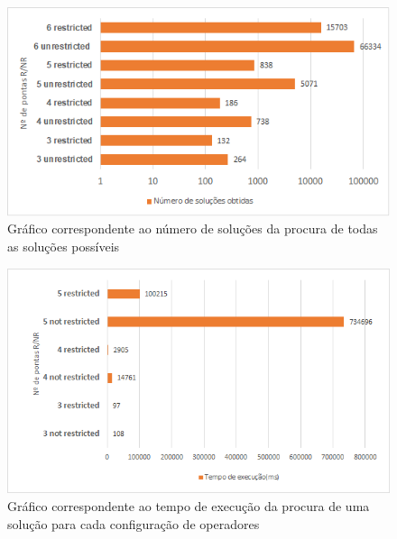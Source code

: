 \begin{figure}[!h]
\includegraphics[width=\textwidth]{images/all_solutions_number_tips_r_nr.png}
\caption{Gráfico correspondente ao número de soluções da procura de todas as soluções possíveis} \label{fig:numero_solucoes_todas_solucoes}
\end{figure}

\begin{figure}[!h]
\includegraphics[width=\textwidth]{images/one_solution_each_configuration.png}
\caption{Gráfico correspondente ao tempo de execução da procura de uma solução para cada configuração de operadores} \label{fig:tempo_execucao_uma_solucao}
\end{figure}

